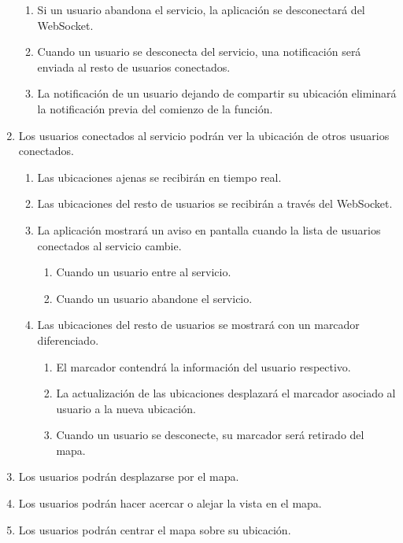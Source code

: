 \begin{enumerate}[label*=RSG \arabic*.]
    \begin{enumerate}[label*=\arabic*.]
        \item Si un usuario abandona el servicio, la aplicación se desconectará del WebSocket.
        \item\label{req:noti_ubicacion_parar}  Cuando un usuario se desconecta del servicio, una notificación será enviada al resto de usuarios conectados.
        \item La notificación de un usuario dejando de compartir su ubicación eliminará la notificación previa del comienzo de la función.
    \end{enumerate}
    \item \label{req:ver_ubicaciones} Los usuarios conectados al servicio podrán ver la ubicación de otros usuarios conectados.
    \begin{enumerate}[label*=\arabic*.]
        \item Las ubicaciones ajenas se recibirán en tiempo real.
        \item Las ubicaciones del resto de usuarios se recibirán a través del WebSocket.
        \item La aplicación mostrará un aviso en pantalla cuando la lista de usuarios conectados al servicio cambie. 
        \begin{enumerate}[label*=\arabic*.]
            \item Cuando un usuario entre al servicio.
            \item Cuando un usuario abandone el servicio.
        \end{enumerate}
        \item Las ubicaciones del resto de usuarios se mostrará con un marcador diferenciado.
        \begin{enumerate}[label*=\arabic*.]
            \item El marcador contendrá la información del usuario respectivo.
            \item La actualización de las ubicaciones desplazará el marcador asociado al usuario a la nueva ubicación.
            \item Cuando un usuario se desconecte, su marcador será retirado del mapa.
        \end{enumerate}
    \end{enumerate}
    \item Los usuarios podrán desplazarse por el mapa.
    \item Los usuarios podrán hacer acercar o alejar la vista en el mapa.
    \item Los usuarios podrán centrar el mapa sobre su ubicación.
\end{enumerate}

